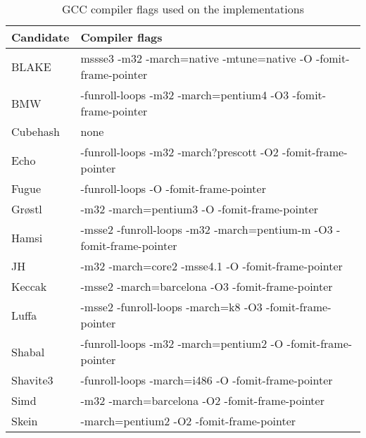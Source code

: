 \begin{table}
  \centering
  \begin{tabular}{ | l | l | }
    \hline
    \textbf{Candidate} & \textbf{Compiler flags}  \\ \hline
     BLAKE       & mssse3 -m32 -march=native -mtune=native -O -fomit-frame-pointer  \\ \hline
     \ac{BMW}    & -funroll-loops -m32 -march=pentium4 -O3 -fomit-frame-pointer     \\ \hline
     Cubehash    & none                                                             \\ \hline
     Echo        & -funroll-loops -m32 -march?prescott -O2 -fomit-frame-pointer     \\ \hline
     Fugue       & -funroll-loops -O -fomit-frame-pointer                           \\ \hline
     Grøstl     & -m32 -march=pentium3 -O -fomit-frame-pointer                     \\ \hline
     Hamsi       & -msse2 -funroll-loops -m32 -march=pentium-m -O3 -fomit-frame-pointer\\ \hline
     JH          & -m32 -march=core2 -msse4.1 -O -fomit-frame-pointer               \\ \hline
     Keccak      & -msse2 -march=barcelona -O3 -fomit-frame-pointer                 \\ \hline
     Luffa       & -msse2 -funroll-loops -march=k8 -O3 -fomit-frame-pointer         \\ \hline
     Shabal      & -funroll-loops -m32 -march=pentium2 -O -fomit-frame-pointer      \\ \hline
     Shavite3    & -funroll-loops -march=i486 -O -fomit-frame-pointer               \\ \hline
     Simd        & -m32 -march=barcelona -O2 -fomit-frame-pointer                   \\ \hline
     Skein       & -march=pentium2 -O2 -fomit-frame-pointer                         \\ \hline
  \end{tabular}
  \caption{GCC compiler flags used on the implementations}
  \label{tbl:sha3:compilerflags}
\end{table}
